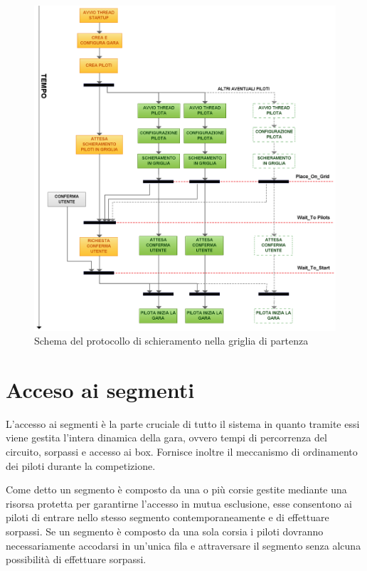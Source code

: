 \documentclass[a4paper,11pt, twoside, openright]{book}
\begin{document}
      \begin{figure}[ht]
	\centering
	\includegraphics[width=140mm,bb=0 0 2009 1854]{./Immagini/SchemaSchieramento.png}
	\caption{Schema del protocollo di schieramento nella griglia di partenza}
	\label{fig:SchemaSchieramento}
      \end{figure}


	    
    \section{Acceso ai segmenti}
    \label{Accesso ai segmenti}
      L'accesso ai segmenti è la parte cruciale di tutto il sistema in quanto tramite essi viene gestita
      l'intera dinamica della gara, ovvero tempi di percorrenza del circuito, sorpassi e accesso ai box.
      Fornisce inoltre il meccanismo di ordinamento dei piloti durante la competizione.
      
      Come detto un segmento è composto da una o più corsie gestite mediante una risorsa protetta per garantirne
      l'accesso in mutua esclusione, esse consentono ai piloti di entrare nello stesso segmento 
      contemporaneamente e di effettuare sorpassi.
      Se un segmento è composto da una sola corsia i piloti dovranno necessariamente accodarsi in un'unica fila e attraversare
      il segmento senza alcuna possibilità di effettuare sorpassi.
      
\end{document}
